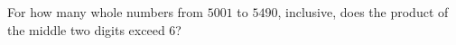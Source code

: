 For how many whole numbers from $5001$ to $5490$, inclusive, does the product of the middle two digits exceed $6$?
